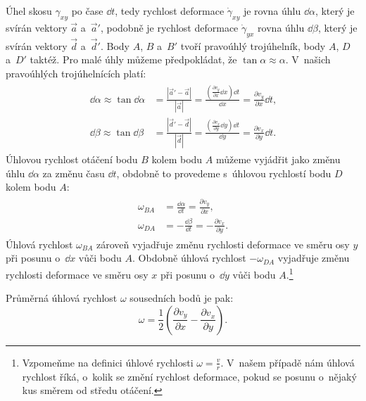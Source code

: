 \documentclass[12pt]{article}
\begin{document}
Úhel skosu $\gamma_{xy}$ po čase $\dd t$, tedy rychlost deformace $\dot\gamma_{xy}$ je rovna úhlu $\dd\alpha$, který je svírán vektory $\vec{a}$ a~$\vec{a}'$, podobně je rychlost deformace $\dot\gamma_{yx}$ rovna úhlu $\dd\beta$, který je svírán vektory $\vec{d}$ a~$\vec{d}'$. Body $A$, $B$ a~$B'$ tvoří pravoúhlý trojúhelník, body $A$, $D$ a~$D'$ taktéž. Pro malé úhly můžeme předpokládat, že $\tan{\alpha} \approx \alpha$. V~našich pravoúhlých trojúhelnících platí:~\cite{YT:Kinematics_of_fluids_elements}~\cite{wiki:Strain_mechanics}~\cite{wiki:Infinitesimal_strain_theory}~\cite{wiki:Deformace}
\begin{align}
    \begin{split}
        \dd\alpha\approx\tan{\dd\alpha} &= \frac{\left|\vec{a}'-\vec{a}\right|}{\left|\vec{a}\right|} = \frac{\left(\frac{\partial v_y}{\partial x}\dd x\right)\dd t}{\dd x} = \frac{\partial v_y}{\partial x}\dd t\text{,}\\
        \dd\beta\approx\tan{\dd\beta} &= \frac{\left|\vec{d}'-\vec{d}\right|}{\left|\vec{d}\right|} = \frac{\left(\frac{\partial v_x}{\partial y}\dd y\right)\dd t}{\dd y} = \frac{\partial v_x}{\partial y}\dd t\text{.}
    \end{split}
\end{align}
Úhlovou rychlost otáčení bodu $B$ kolem bodu $A$ můžeme vyjádřit jako změnu úhlu $\dd\alpha$ za změnu času $\dd t$, obdobně to provedeme s~úhlovou rychlostí bodu $D$ kolem bodu $A$:~\cite{YT:Kinematics_of_fluids_elements}
\begin{align}
    \begin{split}
        \omega_{BA} &= \frac{\dd\alpha}{\dd t} = \frac{\partial v_y}{\partial x}\text{,}\\
        \omega_{DA} &= -\frac{\dd\beta}{\dd t} = -\frac{\partial v_x}{\partial y}\text{.}
    \end{split}
\end{align}
Úhlová rychlost $\omega_{BA}$ zároveň vyjadřuje změnu rychlosti deformace ve směru osy $y$ při posunu o~$\dd x$ vůči bodu $A$. Obdobně úhlová rychlost $-\omega_{DA}$ vyjadřuje změnu rychlosti deformace ve směru osy $x$ při posunu o~$\dd y$ vůči bodu $A$.\footnote{Vzpomeňme na definici úhlové rychlosti $\omega = \frac{v}{r}$. V~našem případě nám úhlová rychlost říká, o~kolik se změní rychlost deformace, pokud se posunu o~nějaký kus směrem od středu otáčení.}
\par
Průměrná úhlová rychlost $\omega$ sousedních bodů je pak:
\begin{equation}
    \omega = \frac{1}{2}\left(\frac{\partial v_y}{\partial x}-\frac{\partial v_x}{\partial y}\right)\text{.}
    \label{eq:omega}
\end{equation}
\end{document}
